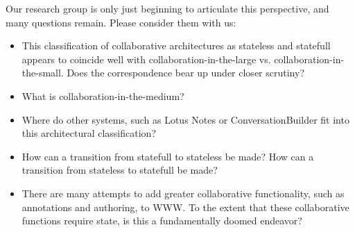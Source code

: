 Our research group is only just beginning to articulate this perspective,
and many questions remain.  Please consider them with us:

\begin{itemize}
\item This classification of collaborative architectures as stateless and
  statefull appears to coincide well with collaboration-in-the-large
  vs. collaboration-in-the-small.  Does the correspondence bear up under
  closer scrutiny?

\item What is collaboration-in-the-medium?

\item Where do other systems, such as Lotus Notes or ConversationBuilder
  fit into this architectural classification?

\item How can a transition from statefull to stateless be made?  How can
  a transition from stateless to statefull be made?

\item There are many attempts to add greater collaborative functionality,
such as annotations and authoring, to WWW.  To the extent that these
collaborative functions require state, is this a fundamentally doomed endeavor?

\end{itemize}


















 
